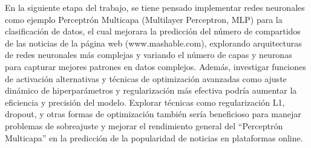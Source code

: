 \documentclass[
  number,
  preprint,
  3p,
  twocolumn]{elsarticle}
\begin{document}
En la siguiente etapa del trabajo, se tiene pensado implementar redes
neuronales como ejemplo Perceptrón Multicapa (Multilayer Perceptron,
MLP) para la clasificación de datos, el cual mejorara la predicción del
número de compartidos de las noticias de la página web
(www.mashable.com), explorando arquitecturas de redes neuronales más
complejas y variando el número de capas y neuronas para capturar mejores
patrones en datos complejos. Además, investigar funciones de activación
alternativas y técnicas de optimización avanzadas como ajuste dinámico
de hiperparámetros y regularización más efectiva podría aumentar la
eficiencia y precisión del modelo. Explorar técnicas como regularización
L1, dropout, y otras formas de optimización también sería beneficioso
para manejar problemas de sobreajuste y mejorar el rendimiento general
del ``Perceptrón Multicapa'' en la predicción de la popularidad de
noticias en plataformas online.


\renewcommand\refname{Referencias}
  
\end{document}
